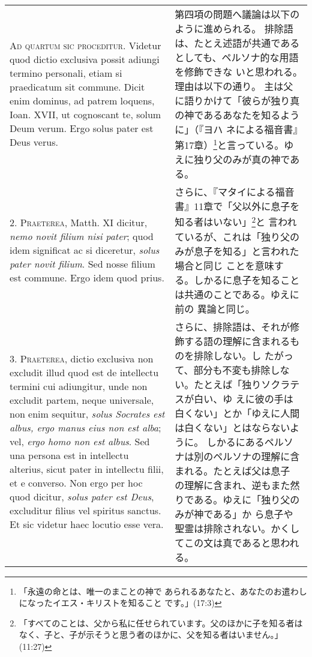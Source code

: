 \documentclass[10pt]{jsarticle} %
\begin{document}
\begin{longtable}{p{21em}p{21em}}

{\scshape Ad quartum sic proceditur}. Videtur quod dictio exclusiva possit
adiungi termino personali, etiam si praedicatum sit commune. Dicit
enim dominus, ad patrem loquens, Ioan. XVII, ut cognoscant te, solum
Deum verum. Ergo solus pater est Deus verus.

&

第四項の問題へ議論は以下のように進められる。
排除語は、たとえ述語が共通であるとしても、ペルソナ的な用語を修飾できな
 いと思われる。理由は以下の通り。
主は父に語りかけて「彼らが独り真の神であるあなたを知るように」（『ヨハ
 ネによる福音書』第17章）\footnote{「永遠の命とは、唯一のまことの神で
 あられるあなたと、あなたのお遣わしになったイエス・キリストを知ること
 です。」(17:3)}と言っている。ゆえに独り父のみが真の神である。

\\



2. {\scshape Praeterea}, Matth. XI dicitur, {\itshape nemo novit filium nisi pater}; quod idem
significat ac si diceretur, {\itshape solus pater novit filium}. Sed nosse filium
est commune. Ergo idem quod prius.

&

さらに、『マタイによる福音書』11章で「父以外に息子を知る者はいない」\footnote{「すべてのことは、父から私に任せられています。父のほかに子を知る者はなく、子と、子が示そうと思う者のほかに、父を知る者はいません。」(11:27) }と
 言われているが、これは「独り父のみが息子を知る」と言われた場合と同じ
 ことを意味する。しかるに息子を知ることは共通のことである。ゆえに前の
 異論と同じ。

\\



3. {\scshape Praeterea}, dictio exclusiva non excludit illud quod est de intellectu
termini cui adiungitur, unde non excludit partem, neque universale,
non enim sequitur, {\itshape solus Socrates est albus, ergo manus eius non est
alba}; vel, {\itshape ergo homo non est albus}. Sed una persona est in intellectu
alterius, sicut pater in intellectu filii, et e converso. Non ergo per
hoc quod dicitur, {\itshape solus pater est Deus}, excluditur filius vel spiritus
sanctus. Et sic videtur haec locutio esse vera.

&

さらに、排除語は、それが修飾する語の理解に含まれるものを排除しない。し
 たがって、部分も不変も排除しない。たとえば「独りソクラテスが白い、ゆ
 えに彼の手は白くない」とか「ゆえに人間は白くない」とはならないように。
 しかるにあるペルソナは別のペルソナの理解に含まれる。たとえば父は息子
 の理解に含まれ、逆もまた然りである。ゆえに「独り父のみが神である」か
 ら息子や聖霊は排除されない。かくしてこの文は真であると思われる。



\end{longtable}
\end{document}
